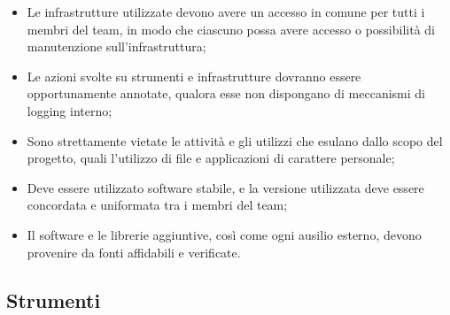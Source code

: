 	\begin{itemize}
		\item Le infrastrutture utilizzate devono avere un accesso in comune per tutti i membri del team, in modo che ciascuno possa avere accesso o possibilità di manutenzione sull'infrastruttura;
		\item Le azioni svolte su strumenti e infrastrutture dovranno essere opportunamente annotate, qualora esse non dispongano di meccanismi di logging interno;
		\item Sono strettamente vietate le attività e gli utilizzi che esulano dallo scopo del progetto, quali l'utilizzo di file e applicazioni di carattere personale;
		\item Deve essere utilizzato software stabile, e la versione utilizzata deve essere concordata e uniformata tra i membri del team;
		\item Il software e le librerie aggiuntive, così come ogni ausilio esterno, devono provenire da fonti affidabili e verificate.
	\end{itemize}
	
	\newpage
	\subsection{Strumenti}

